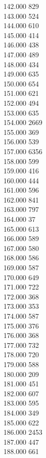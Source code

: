 { 142.000	829 \\
 143.000	524 \\
 144.000	610 \\
 145.000	414 \\
 146.000	438 \\
 147.000	489 \\
 148.000	434 \\
 149.000	635 \\
 150.000	654 \\
 151.000	621 \\
 152.000	494 \\
 153.000	635 \\
 154.000	2669 \\
 155.000	369 \\
 156.000	539 \\
 157.000	6356 \\
 158.000	599 \\
 159.000	416 \\
 160.000	444 \\
 161.000	596 \\
 162.000	841 \\
 163.000	797 \\
 164.000	37 \\
 165.000	613 \\
 166.000	589 \\
 167.000	580 \\
 168.000	586 \\
 169.000	587 \\
 170.000	649 \\
 171.000	722 \\
 172.000	368 \\
 173.000	353 \\
 174.000	587 \\
 175.000	376 \\
 176.000	368 \\
 177.000	732 \\
 178.000	720 \\
 179.000	588 \\
 180.000	209 \\
 181.000	451 \\
 182.000	607 \\
 183.000	595 \\
 184.000	349 \\
 185.000	622 \\
 186.000	2453 \\
 187.000	447 \\
 188.000	661 \\
}
